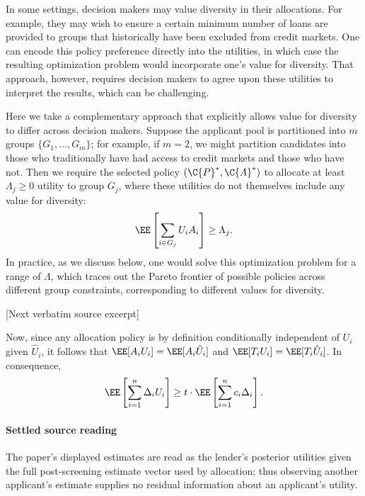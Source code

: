 \documentclass[10pt]{article}
\begin{document}
\begin{ReviewVerbatim}
In some settings, decision makers may value diversity in their allocations.
For example, they may wish to ensure a certain minimum number of loans are provided to groups that historically have been excluded from credit markets.
One can encode this policy preference directly into the utilities, in which case the resulting optimization problem would incorporate one's value for diversity.
That approach, however, requires decision makers to agree upon these utilities to interpret the results, which can be challenging.

Here we take a complementary approach that explicitly allows value for diversity to differ across decision makers.
Suppose the applicant pool is partitioned into \(m\) groups \(\{G_1, \ldots, G_m\}\);
for example, if \(m = 2\), we might partition candidates into those who traditionally have had access to credit markets and those who have not.
Then we require the selected policy \((\C{P}^*, \C{A}^*)\)
to allocate at least \(\Lambda_j \geq 0\) utility to group \(G_j\), where these utilities do not themselves include any value for diversity:
    \begin{equation}
    \label{eq:def3}
        \EE \left[ \sum_{i \in G_j} U_i A_i \right] \geq \Lambda_j.
    \end{equation}
In practice, as we discuss below, one would solve this optimization problem for a range of \(\Lambda\), which traces out the Pareto frontier of possible policies across different group constraints, corresponding to different values for diversity.

[Next verbatim source excerpt]

Now, since any allocation policy is by definition conditionally independent of \(U_i\) given \(\hat U_i\), it follows that \(\EE [A_i U_i] = \EE [A_i \hat U_i]\) and \(\EE [T_i U_i] = \EE [T_i \hat U_i]\). In consequence,
\begin{equation}
    \label{eq:key}
        \EE \left[ \sum_{i = 1}^n \Delta_i U_i \right] \geq t \cdot \EE \left[ \sum_{i = 1}^n c_i \Delta_i \right].
    \end{equation}
\end{ReviewVerbatim}

\paragraph{Settled source reading}
\begin{sloppypar}
The paper's displayed estimates are read as the lender's posterior utilities given the full post-\allowbreak{}screening estimate vector used by allocation;\allowbreak{} thus observing another applicant's estimate supplies no residual information about an applicant's utility.\allowbreak{}
\end{sloppypar}
\end{document}
